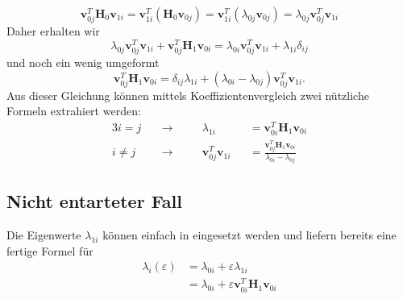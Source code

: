 \begin{equation}
    \bm v_{0j}^T \bm H_0 \bm v_{1i}
    =
    \bm v_{1i}^T \left(\bm H_0  \bm v_{0j} \right)
    =
    \bm v_{1i}^T \left(\lambda_{0j}  \bm v_{0j} \right)
    =
    \lambda_{0j} \bm v_{0j}^T \bm v_{1i}
\end{equation}
Daher erhalten wir
\begin{equation}
    \lambda_{0j} \bm v_{0j}^T \bm v_{1i} +
    \bm v_{0j}^T \bm H_1 \bm v_{0i}
    =
    \lambda_{0i} \bm v_{0j}^T \bm v_{1i} +
    \lambda_{1i} \delta_{ij}
\end{equation}
und noch ein wenig umgeformt
\begin{equation}
    \bm v_{0j}^T \bm H_1 \bm v_{0i}
    =
    \delta_{ij} \lambda_{1i} +
    ( \lambda_{0i} - \lambda_{0j} )
    \bm v_{0j}^T  \bm v_{1i} .
\end{equation} \label{ew:eq:f}
Aus dieser Gleichung können mittels Koeffizientenvergleich zwei nützliche Formeln extrahiert werden:
\begin{alignat}{3}
    i = j \quad & \rightarrow  \quad && \lambda_{1i}&& = \bm v_{0i}^T \bm H_1 \bm v_{0i} \\
    i \neq j \quad & \rightarrow \quad && \bm v_{0j}^T \bm v_{1i}&& = \frac{\bm v_{0j}^T \bm H_1 \bm v_{0i}}{\lambda_{0i} - \lambda_{0j}}  \label{ew:eq:f2}
\end{alignat}

\subsection{Nicht entarteter Fall}

Die Eigenwerte $\lambda_{1i}$ können einfach in  eingesetzt werden und liefern bereits eine fertige Formel für
\begin{align*}
    \lambda_i(\varepsilon)
    &=
    \lambda_{0i} + \varepsilon \lambda_{1i} \\
    &=
    \lambda_{0i} + \varepsilon \bm v_{0i}^T \bm H_1 \bm v_{0i}
\end{align*}

